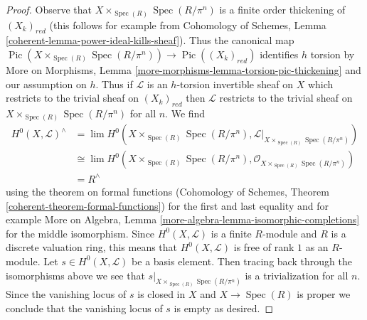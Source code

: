 \documentclass[10pt,a4paper]{amsart}
\theoremstyle{plain}
\theoremstyle{definition}
\theoremstyle{remark}
\numberwithin{equation}{subsection}
\def\lim{\mathop{\mathrm{lim}}\nolimits}
\def\Spec{\mathop{\mathrm{Spec}}}
\def\Pic{\mathop{\mathrm{Pic}}\nolimits}
\begin{document}
\begin{proof}
Observe that $X \times_{\Spec(R)} \Spec(R/\pi^n)$ is a finite
order thickening of $(X_k)_{red}$ (this follows for example from
Cohomology of Schemes, Lemma \ref{coherent-lemma-power-ideal-kills-sheaf}).
Thus the canonical map
$\Pic(X \times_{\Spec(R)} \Spec(R/\pi^n)) \to \Pic((X_k)_{red})$
identifies $h$ torsion by
More on Morphisms, Lemma \ref{more-morphisms-lemma-torsion-pic-thickening}
and our assumption on $h$.
Thus if $\mathcal{L}$ is an $h$-torsion invertible sheaf on $X$
which restricts to the trivial sheaf on $(X_k)_{red}$ then
$\mathcal{L}$ restricts to the trivial sheaf on
$X \times_{\Spec(R)} \Spec(R/\pi^n)$ for all $n$.
We find
\begin{align*}
H^0(X, \mathcal{L})^\wedge
& =
\lim H^0(X \times_{\Spec(R)} \Spec(R/\pi^n),
\mathcal{L}|_{X \times_{\Spec(R)} \Spec(R/\pi^n)}) \\
& \cong
\lim H^0(X \times_{\Spec(R)} \Spec(R/\pi^n),
\mathcal{O}_{X \times_{\Spec(R)} \Spec(R/\pi^n)}) \\
& =
R^\wedge
\end{align*}
using the theorem on formal functions
(Cohomology of Schemes, Theorem \ref{coherent-theorem-formal-functions})
for the first and last equality and for example
More on Algebra, Lemma \ref{more-algebra-lemma-isomorphic-completions}
for the middle isomorphism. Since $H^0(X, \mathcal{L})$ is a finite
$R$-module and $R$ is a discrete valuation ring, this means that
$H^0(X, \mathcal{L})$ is free of rank $1$ as an $R$-module.
Let $s \in H^0(X, \mathcal{L})$ be a basis element.
Then tracing back through the isomorphisms above we see
that $s|_{X \times_{\Spec(R)} \Spec(R/\pi^n)}$ is a trivialization
for all $n$. Since the vanishing locus of $s$ is closed in $X$
and $X \to \Spec(R)$ is proper we conclude that the vanishing
locus of $s$ is empty as desired.
\end{proof}
\end{document}
